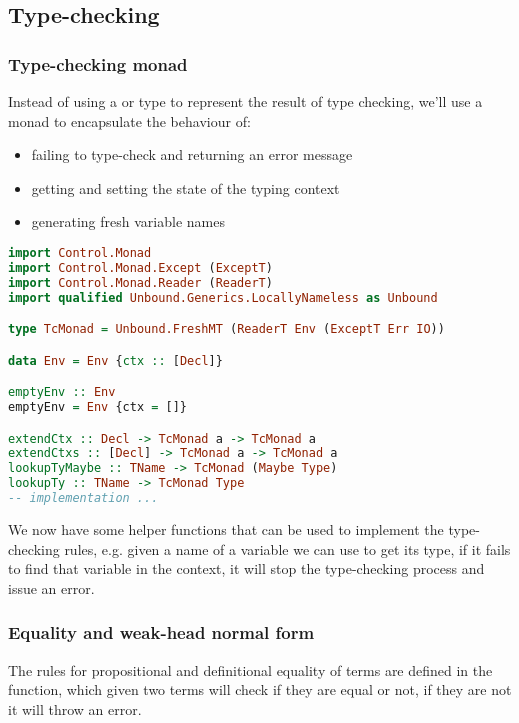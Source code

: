 \documentclass[
       embeddedlogo,
       english,
       lmodern,
       coorientadorbanca,
       noabntexcite
]{ufsc-thesis-rn46-2019}
\theoremstyle{definition}
\newcommand{\code}[1]{\text{\scpfamily\setlength\spaceskip{0.35em}#1}}
\begin{document}
\subsection{Type-checking}

\subsubsection{Type-checking monad}
Instead of using a \code{Maybe} or \code{Either} type to represent the result of type checking, we'll use a monad to encapsulate the behaviour of:
\begin{itemize}
       \item failing to type-check and returning an error message
       \item getting and setting the state of the typing context
       \item generating fresh variable names
\end{itemize}

\begin{lstlisting}[language=Haskell]
import Control.Monad
import Control.Monad.Except (ExceptT)
import Control.Monad.Reader (ReaderT)
import qualified Unbound.Generics.LocallyNameless as Unbound

type TcMonad = Unbound.FreshMT (ReaderT Env (ExceptT Err IO))

data Env = Env {ctx :: [Decl]}

emptyEnv :: Env
emptyEnv = Env {ctx = []}

extendCtx :: Decl -> TcMonad a -> TcMonad a
extendCtxs :: [Decl] -> TcMonad a -> TcMonad a
lookupTyMaybe :: TName -> TcMonad (Maybe Type)
lookupTy :: TName -> TcMonad Type
-- implementation ...
\end{lstlisting}

We now have some helper functions that can be used to implement the type-checking rules, e.g. given a name of a variable we can use \code{lookupTy} to get its type, if it fails to find that variable in the context, it will stop the type-checking process and issue an error.

\subsubsection{Equality and weak-head normal form}

The rules for propositional and definitional equality of terms are defined in the \code{equate} function, which given two terms will check if they are equal or not, if they are not it will throw an error.
\end{document}
